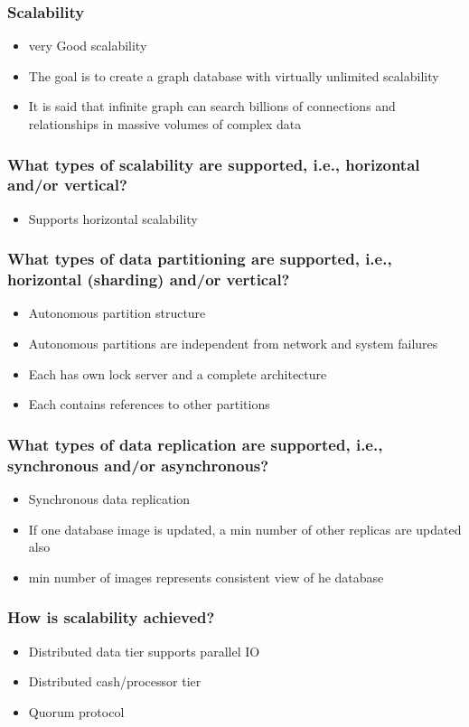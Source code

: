 \begin{frame}
\frametitle{Scalability}
\begin{itemize}
  \item very Good scalability
         \item The goal is to create a graph database with virtually unlimited scalability
         \item It is said that infinite graph can search billions of connections and relationships in massive volumes of complex data
\end{itemize}
\end{frame} 


\begin{frame}
\frametitle{What types of scalability are supported, i.e., horizontal and/or vertical?}
\begin{itemize}
	\item Supports horizontal scalability
\end{itemize}
\end{frame} 

\begin{frame}
\frametitle{What types of data partitioning are supported, i.e., horizontal (sharding) and/or vertical?}
\begin{itemize}
	\item Autonomous partition structure	
	\item Autonomous partitions are independent from network and system failures
	\item Each has own lock server and a complete architecture
	\item Each contains references to other partitions
\end{itemize}
\end{frame} 

\begin{frame}
\frametitle{What types of data replication are supported, i.e., synchronous and/or asynchronous?}
\begin{itemize}
	\item Synchronous data replication
	\item If one database image is updated, a min number of other replicas are updated also
	\item min number of images represents consistent view of he database
\end{itemize}
\end{frame} 

\begin{frame}
\frametitle{How is scalability achieved?}
\begin{itemize}
	\item Distributed data tier supports parallel IO
	\item Distributed cash/processor tier
         \item Quorum protocol
\end{itemize}
\end{frame} 

